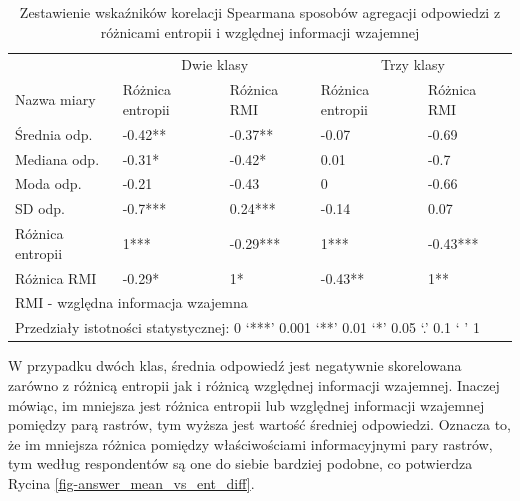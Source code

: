 \documentclass{amuthesis}
\begin{document}
\hypertarget{tbl-mc2_signif_table}{}
\begin{table}
\caption{\label{tbl-mc2_signif_table}Zestawienie wskaźników korelacji Spearmana sposobów agregacji odpowiedzi
z różnicami entropii i względnej informacji wzajemnej }\tabularnewline

\centering
\begin{tabular}{lllll}
\toprule
\multicolumn{1}{c}{ } & \multicolumn{2}{c}{Dwie klasy} & \multicolumn{2}{c}{Trzy klasy} \\
\cmidrule(l{3pt}r{3pt}){2-3} \cmidrule(l{3pt}r{3pt}){4-5}
Nazwa miary & Różnica entropii & Różnica RMI & Różnica entropii & Różnica RMI\\
\midrule
Średnia odp. & -0.42** & -0.37** & -0.07 & -0.69\\
Mediana odp. & -0.31* & -0.42* & 0.01 & -0.7\\
Moda odp. & -0.21 & -0.43 & 0 & -0.66\\
SD odp. & -0.7*** & 0.24*** & -0.14 & 0.07\\
Różnica entropii & 1*** & -0.29*** & 1*** & -0.43***\\
Różnica RMI & -0.29* & 1* & -0.43** & 1**\\
\bottomrule
\multicolumn{5}{l}{\rule{0pt}{1em}RMI - względna informacja wzajemna}\\
\multicolumn{5}{l}{\rule{0pt}{1em}Przedziały istotności statystycznej:  0 ‘***’ 0.001 ‘**’ 0.01 ‘*’ 0.05 ‘.’ 0.1 ‘ ’ 1}\\
\end{tabular}
\end{table}

W przypadku dwóch klas, średnia odpowiedź jest negatywnie skorelowana
zarówno z różnicą entropii jak i różnicą względnej informacji wzajemnej.
Inaczej mówiąc, im mniejsza jest różnica entropii lub względnej
informacji wzajemnej pomiędzy parą rastrów, tym wyższa jest wartość
średniej odpowiedzi. Oznacza to, że im mniejsza różnica pomiędzy
właściwościami informacyjnymi pary rastrów, tym według respondentów są
one do siebie bardziej podobne, co potwierdza Rycina
\ref{fig-answer_mean_vs_ent_diff}.
\end{document}
